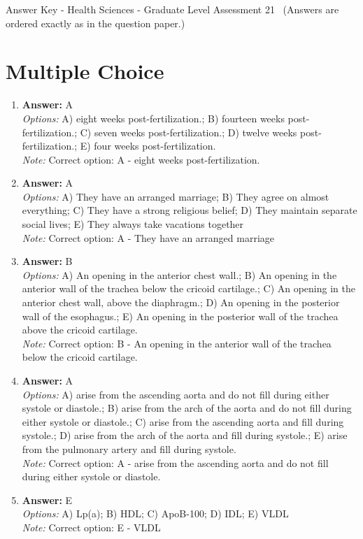 \documentclass[12pt]{article}
\begin{document}
\begin{center}
Answer Key - Health Sciences - Graduate Level Assessment 21 \
\small (Answers are ordered exactly as in the question paper.)
\end{center}

\section*{Multiple Choice}
\begin{enumerate}[label=\arabic*.]
\item \textbf{Answer:} A
\\ \textit{Options:} A) eight weeks post-fertilization.; B) fourteen weeks post-fertilization.; C) seven weeks post-fertilization.; D) twelve weeks post-fertilization.; E) four weeks post-fertilization.
\\ \textit{Note:} Correct option: A - eight weeks post-fertilization.
\item \textbf{Answer:} A
\\ \textit{Options:} A) They have an arranged marriage; B) They agree on almost everything; C) They have a strong religious belief; D) They maintain separate social lives; E) They always take vacations together
\\ \textit{Note:} Correct option: A - They have an arranged marriage
\item \textbf{Answer:} B
\\ \textit{Options:} A) An opening in the anterior chest wall.; B) An opening in the anterior wall of the trachea below the cricoid cartilage.; C) An opening in the anterior chest wall, above the diaphragm.; D) An opening in the posterior wall of the esophagus.; E) An opening in the posterior wall of the trachea above the cricoid cartilage.
\\ \textit{Note:} Correct option: B - An opening in the anterior wall of the trachea below the cricoid cartilage.
\item \textbf{Answer:} A
\\ \textit{Options:} A) arise from the ascending aorta and do not fill during either systole or diastole.; B) arise from the arch of the aorta and do not fill during either systole or diastole.; C) arise from the ascending aorta and fill during systole.; D) arise from the arch of the aorta and fill during systole.; E) arise from the pulmonary artery and fill during systole.
\\ \textit{Note:} Correct option: A - arise from the ascending aorta and do not fill during either systole or diastole.
\item \textbf{Answer:} E
\\ \textit{Options:} A) Lp(a); B) HDL; C) ApoB-100; D) IDL; E) VLDL
\\ \textit{Note:} Correct option: E - VLDL
\end{enumerate}
\end{document}
